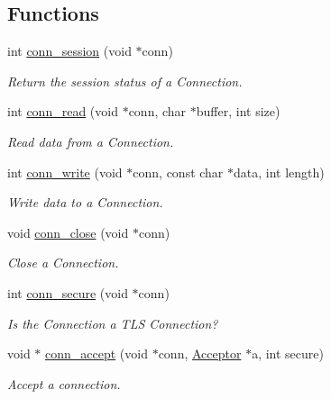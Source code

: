 \subsection*{Functions}
\begin{DoxyCompactItemize}
\item 
int \hyperlink{group__connection_ga2235487c1e762621555875579dc10fea}{conn\+\_\+session} (void $\ast$conn)
\begin{DoxyCompactList}\small\item\em Return the session status of a Connection. \end{DoxyCompactList}\item 
int \hyperlink{group__connection_ga8b841fbab5b0a476ce2d8bf8a05ecbcd}{conn\+\_\+read} (void $\ast$conn, char $\ast$buffer, int size)
\begin{DoxyCompactList}\small\item\em Read data from a Connection. \end{DoxyCompactList}\item 
int \hyperlink{group__connection_gae63df32b30da421837e2c67cfacc3497}{conn\+\_\+write} (void $\ast$conn, const char $\ast$data, int length)
\begin{DoxyCompactList}\small\item\em Write data to a Connection. \end{DoxyCompactList}\item 
void \hyperlink{group__connection_gada463d4dd44545e50cd269a5c363787d}{conn\+\_\+close} (void $\ast$conn)
\begin{DoxyCompactList}\small\item\em Close a Connection. \end{DoxyCompactList}\item 
int \hyperlink{group__connection_ga5fb5239072d730188d6a86b611146005}{conn\+\_\+secure} (void $\ast$conn)
\begin{DoxyCompactList}\small\item\em Is the Connection a T\+LS Connection? \end{DoxyCompactList}\item 
void $\ast$ \hyperlink{group__connection_gaa06e12daa8e40fc9090823e03283a3d6}{conn\+\_\+accept} (void $\ast$conn, \hyperlink{group__tcp_ga99fb3ed761c86c0379dc50f80c51c87a}{Acceptor} $\ast$a, int secure)
\begin{DoxyCompactList}\small\item\em Accept a connection. \end{DoxyCompactList}\item 

\end{DoxyCompactItemize}
